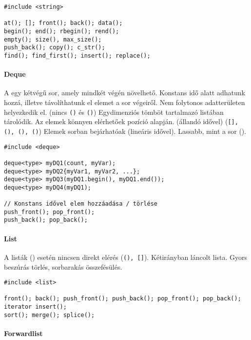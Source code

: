 \documentclass[../../main.tex]{subfiles}
\begin{document}
\begin{verbatim}
#include <string>

at(); []; front(); back(); data();
begin(); end(); rbegin(); rend();
empty(); size(), max_size();
push_back(); copy(); c_str();
find(); find_first(); insert(); replace();
\end{verbatim}

\paragraph*{Deque}

A  egy kétvégű sor, amely mindkét végén növelhető.
Konstans idő alatt adhatunk hozzá, illetve távolíthatunk el elemet a sor végeiről.
Nem folytonos adatterületen helyezkedik el. (nincs \texttt{()} és
\texttt{()}) Egydimenziós tömböt tartalmazó listában tárolódik.
Az elemek könnyen elérhetőek pozíció alapján. (állandó idővel)
(\texttt{[], (), (), ()}) Elemek sorban bejárhatóak
(lineáris idővel). Lassabb, mint a sor ().

\begin{verbatim}
#include <deque>

deque<type> myDQ1(count, myVar);
deque<type> myDQ2{myVar1, myVar2, ...};
deque<type> myDQ3(myDQ1.begin(), myDQ1.end());
deque<type> myDQ4(myDQ1);

// Konstans idővel elem hozzáadása / törlése
push_front(); pop_front();
push_back(); pop_back();
\end{verbatim}

\paragraph*{List}

A listák () esetén nincsen direkt elérés (\texttt{(), []}).
Kétirányban láncolt lista. Gyors beszúrás törlés, sorbarakás összefésülés.
\begin{verbatim}
#include <list>

front(); back(); push_front(); push_back(); pop_front(); pop_back();
iterator insert();
sort(); merge(); splice();
\end{verbatim}

\paragraph*{Forward{}\textunderscore{}list}
\end{document}
